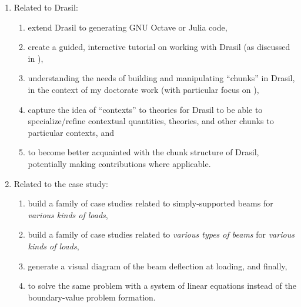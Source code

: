 \documentclass{article}
\begin{document}
\begin{enumerate}
    \item Related to Drasil:
          \begin{enumerate}
              \item extend Drasil to generating GNU Octave or Julia code,
              \item create a guided, interactive tutorial on working with Drasil
                    (as discussed in \cite{BalaciDrasilIssueComment3194}),
              \item understanding the needs of building and manipulating
                    ``chunks'' \cite{Drasil2023} in Drasil, in the context of my
                    doctorate work (with particular focus on
                    \cite{BalaciDrasilDiscussion3003}),
              \item capture the idea of ``contexts'' to theories for Drasil to
                    be able to specialize/refine contextual quantities,
                    theories, and other chunks to particular contexts, and
              \item to become better acquainted with the chunk structure of
                    Drasil, potentially making contributions where applicable.
          \end{enumerate}

    \item Related to the case study:
          \begin{enumerate}
              \item build a family of case studies related to simply-supported
                    beams for \textit{various kinds of loads},
              \item build a family of case studies related to \textit{various
                        types of beams} for \textit{various kinds of loads},
              \item generate a visual diagram of the beam deflection at loading,
                    and finally,
              \item to solve the same problem with a system of linear equations
                    instead of the boundary-value problem formation.
          \end{enumerate}
\end{enumerate}

\newpage

\printbibliography[heading=bibintoc]
\end{document}
